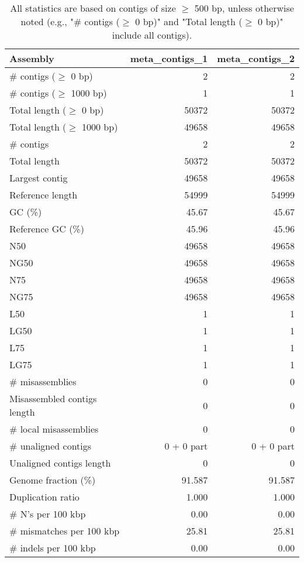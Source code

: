 \documentclass[12pt,a4paper]{article}
\begin{document}
\begin{table}[ht]
\begin{center}
\caption{All statistics are based on contigs of size $\geq$ 500 bp, unless otherwise noted (e.g., "\# contigs ($\geq$ 0 bp)" and "Total length ($\geq$ 0 bp)" include all contigs).}
\begin{tabular}{|l*{2}{|r}|}
\hline
Assembly & meta\_contigs\_1 & meta\_contigs\_2 \\ \hline
\# contigs ($\geq$ 0 bp) & 2 & 2 \\ \hline
\# contigs ($\geq$ 1000 bp) & 1 & 1 \\ \hline
Total length ($\geq$ 0 bp) & 50372 & 50372 \\ \hline
Total length ($\geq$ 1000 bp) & 49658 & 49658 \\ \hline
\# contigs & 2 & 2 \\ \hline
Total length & 50372 & 50372 \\ \hline
Largest contig & 49658 & 49658 \\ \hline
Reference length & 54999 & 54999 \\ \hline
GC (\%) & 45.67 & 45.67 \\ \hline
Reference GC (\%) & 45.96 & 45.96 \\ \hline
N50 & 49658 & 49658 \\ \hline
NG50 & 49658 & 49658 \\ \hline
N75 & 49658 & 49658 \\ \hline
NG75 & 49658 & 49658 \\ \hline
L50 & 1 & 1 \\ \hline
LG50 & 1 & 1 \\ \hline
L75 & 1 & 1 \\ \hline
LG75 & 1 & 1 \\ \hline
\# misassemblies & 0 & 0 \\ \hline
Misassembled contigs length & 0 & 0 \\ \hline
\# local misassemblies & 0 & 0 \\ \hline
\# unaligned contigs & 0 + 0 part & 0 + 0 part \\ \hline
Unaligned contigs length & 0 & 0 \\ \hline
Genome fraction (\%) & 91.587 & 91.587 \\ \hline
Duplication ratio & 1.000 & 1.000 \\ \hline
\# N's per 100 kbp & 0.00 & 0.00 \\ \hline
\# mismatches per 100 kbp & 25.81 & 25.81 \\ \hline
\# indels per 100 kbp & 0.00 & 0.00 \\ \hline

\end{tabular}
\end{center}
\end{table}
\end{document}
